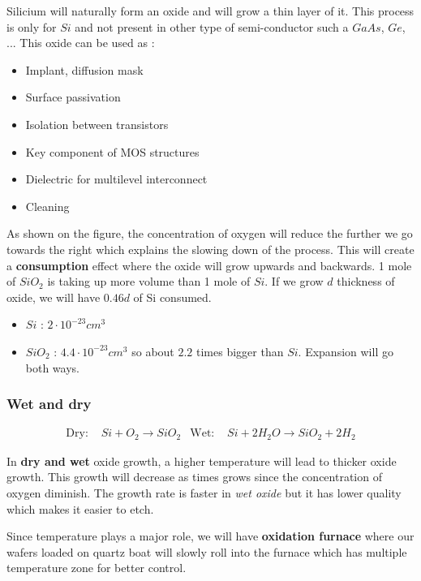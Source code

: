 \documentclass[
]{article}
\begin{document}
Silicium will naturally form an oxide and will grow a thin layer of it.
This process is only for \(Si\) and not present in other type of
semi-conductor such a \(GaAs\), \(Ge\), ... This oxide can be used as :

\begin{itemize}
\item
  Implant, diffusion mask
\item
  Surface passivation
\item
  Isolation between transistors
\item
  Key component of MOS structures
\item
  Dielectric for multilevel interconnect
\item
  Cleaning
\end{itemize}

As shown on the figure, the concentration of oxygen will reduce the
further we go towards the right which explains the slowing down of the
process. This will create a \textbf{consumption} effect where the oxide
will grow upwards and backwards. 1 mole of \(SiO_2\) is taking up more
volume than 1 mole of \(Si\). If we grow \(d\) thickness of oxide, we
will have \(0.46d\) of Si consumed.

\begin{itemize}
\item
  \(Si\) : \(2\cdot 10^{-23} cm^3\)
\item
  \(SiO_2\) : \(4.4\cdot 10^{-23} cm^3\) so about \(2.2\) times bigger
  than \(Si\). Expansion will go both ways.
\end{itemize}

\hypertarget{wet-and-dry}{%
\subsubsection{Wet and dry}\label{wet-and-dry}}

\[\begin{aligned}
    \text{Dry: }& Si + O_2 \rightarrow SiO_2 & \text{Wet: }& Si + 2H_2O \rightarrow SiO_2 + 2H_2
\end{aligned}\]

In \textbf{dry and wet} oxide growth, a higher temperature will lead to
thicker oxide growth. This growth will decrease as times grows since the
concentration of oxygen diminish. The growth rate is faster in \emph{wet
oxide} but it has lower quality which makes it easier to etch.

Since temperature plays a major role, we will have \textbf{oxidation
furnace} where our wafers loaded on quartz boat will slowly roll into
the furnace which has multiple temperature zone for better control.
\end{document}
